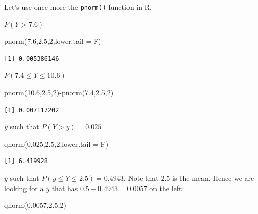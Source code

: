\documentclass[
  letterpaper,
  DIV=11,
  numbers=noendperiod]{scrreprt}
\newenvironment{Shaded}{\begin{snugshade}}{\end{snugshade}}
\newcommand{\AttributeTok}[1]{\textcolor[rgb]{0.40,0.45,0.13}{#1}}
\newcommand{\DecValTok}[1]{\textcolor[rgb]{0.68,0.00,0.00}{#1}}
\newcommand{\FloatTok}[1]{\textcolor[rgb]{0.68,0.00,0.00}{#1}}
\newcommand{\FunctionTok}[1]{\textcolor[rgb]{0.28,0.35,0.67}{#1}}
\newcommand{\NormalTok}[1]{\textcolor[rgb]{0.00,0.23,0.31}{#1}}
\newcommand{\SpecialCharTok}[1]{\textcolor[rgb]{0.37,0.37,0.37}{#1}}
\begin{document}
Let's use once more the \texttt{pnorm()} function in R.

\(P(Y>7.6)\)

\begin{Shaded}
\begin{Highlighting}[numbers=left,,]
\FunctionTok{pnorm}\NormalTok{(}\FloatTok{7.6}\NormalTok{,}\FloatTok{2.5}\NormalTok{,}\DecValTok{2}\NormalTok{,}\AttributeTok{lower.tail =}\NormalTok{ F)}
\end{Highlighting}
\end{Shaded}

\begin{verbatim}
[1] 0.005386146
\end{verbatim}

\(P(7.4 \leq Y \leq 10.6)\)

\begin{Shaded}
\begin{Highlighting}[numbers=left,,]
\FunctionTok{pnorm}\NormalTok{(}\FloatTok{10.6}\NormalTok{,}\FloatTok{2.5}\NormalTok{,}\DecValTok{2}\NormalTok{)}\SpecialCharTok{{-}}\FunctionTok{pnorm}\NormalTok{(}\FloatTok{7.4}\NormalTok{,}\FloatTok{2.5}\NormalTok{,}\DecValTok{2}\NormalTok{)}
\end{Highlighting}
\end{Shaded}

\begin{verbatim}
[1] 0.007117202
\end{verbatim}

\(y\) such that \(P(Y>y)=0.025\)

\begin{Shaded}
\begin{Highlighting}[numbers=left,,]
\FunctionTok{qnorm}\NormalTok{(}\FloatTok{0.025}\NormalTok{,}\FloatTok{2.5}\NormalTok{,}\DecValTok{2}\NormalTok{,}\AttributeTok{lower.tail =}\NormalTok{ F)}
\end{Highlighting}
\end{Shaded}

\begin{verbatim}
[1] 6.419928
\end{verbatim}

\(y\) such that \(P(y \leq Y \leq 2.5)=0.4943\). Note that \(2.5\) is
the mean. Hence we are looking for a \(y\) that has
\(0.5-0.4943=0.0057\) on the left:

\begin{Shaded}
\begin{Highlighting}[numbers=left,,]
\FunctionTok{qnorm}\NormalTok{(}\FloatTok{0.0057}\NormalTok{,}\FloatTok{2.5}\NormalTok{,}\DecValTok{2}\NormalTok{)}
\end{Highlighting}
\end{Shaded}
\end{document}
